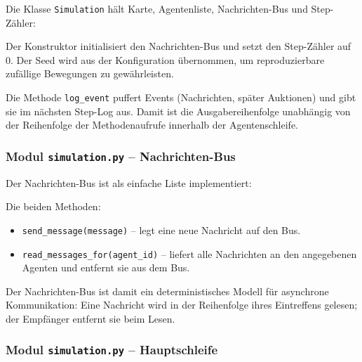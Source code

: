 Die Klasse \texttt{Simulation} hält Karte, Agentenliste, Nachrichten-Bus und Step-Zähler:



Der Konstruktor initialisiert den Nachrichten-Bus und setzt den Step-Zähler auf 0. Der Seed wird aus der Konfiguration übernommen, um reproduzierbare zufällige Bewegungen zu gewährleisten.

Die Methode \texttt{log\_event} puffert Events (Nachrichten, später Auktionen) und gibt sie im nächsten Step-Log aus. Damit ist die Ausgabereihenfolge unabhängig von der Reihenfolge der Methodenaufrufe innerhalb der Agentenschleife.


\subsubsection{Modul \texttt{simulation.py} – Nachrichten-Bus}

Der Nachrichten-Bus ist als einfache Liste implementiert:



Die beiden Methoden:
\begin{itemize}
    \item \texttt{send\_message(message)} – legt eine neue Nachricht auf den Bus.
    \item \texttt{read\_messages\_for(agent\_id)} – liefert alle Nachrichten an den angegebenen Agenten und entfernt sie aus dem Bus.
\end{itemize}

Der Nachrichten-Bus ist damit ein deterministisches Modell für asynchrone Kommunikation: Eine Nachricht wird in der Reihenfolge ihres Eintreffens gelesen; der Empfänger entfernt sie beim Lesen.


\subsubsection{Modul \texttt{simulation.py} – Hauptschleife}

